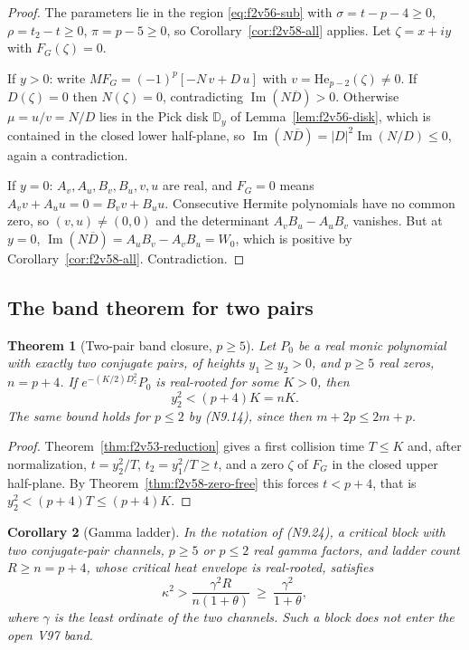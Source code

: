 \documentclass[11pt]{article}
\newtheorem{theorem}{Theorem}[section]
\newtheorem{corollary}[theorem]{Corollary}
\theoremstyle{definition}
\theoremstyle{remark}
\begin{document}
\begin{proof}
The parameters lie in the region \eqref{eq:f2v56-sub} with
\(\sigma=t-p-4\ge0\), \(\rho=t_2-t\ge0\), \(\pi=p-5\ge0\), so
Corollary~\ref{cor:f2v58-all} applies.  Let \(\zeta=x+iy\) with
\(F_G(\zeta)=0\).

If \(y>0\): write \(MF_G=(-1)^p[-N\,v+D\,u]\) with
\(v=\mathrm{He}_{p-2}(\zeta)\ne0\).  If \(D(\zeta)=0\) then
\(N(\zeta)=0\), contradicting \(\operatorname{Im}(N\overline D)>0\).
Otherwise \(\mu=u/v=N/D\) lies in the Pick disk \(\mathbb D_y\) of
Lemma~\ref{lem:f2v56-disk}, which is contained in the closed lower
half-plane, so \(\operatorname{Im}(N\overline D)=|D|^2\operatorname{Im}(N/D)\le0\),
again a contradiction.

If \(y=0\): \(A_v,A_u,B_v,B_u,v,u\) are real, and \(F_G=0\) means
\(A_vv+A_uu=0=B_vv+B_uu\).  Consecutive Hermite polynomials have no
common zero, so \((v,u)\ne(0,0)\) and the determinant
\(A_vB_u-A_uB_v\) vanishes.  But at \(y=0\),
\(\operatorname{Im}(N\overline D)=A_uB_v-A_vB_u=W_0\), which is positive
by Corollary~\ref{cor:f2v58-all}.  Contradiction.
\end{proof}

\subsection{The band theorem for two pairs}

\begin{theorem}[Two-pair band closure, \(p\ge5\)]
\label{thm:f2v58-band}
Let \(P_0\) be a real monic polynomial with exactly two conjugate pairs,
of heights \(y_1\ge y_2>0\), and \(p\ge5\) real zeros, \(n=p+4\).  If
\(e^{-(K/2)D_z^2}P_0\) is real-rooted for some \(K>0\), then
\begin{equation}
 \boxed{\;y_2^2<(p+4)K=nK.\;}
 \label{eq:f2v58-bound}
\end{equation}
The same bound holds for \(p\le2\) by \textup{(N9.14)}, since then
\(m+2p\le2m+p\).
\end{theorem}

\begin{proof}
Theorem~\ref{thm:f2v53-reduction} gives a first collision time
\(T\le K\) and, after normalization, \(t=y_2^2/T\), \(t_2=y_1^2/T\ge t\),
and a zero \(\zeta\) of \(F_G\) in the closed upper half-plane.  By
Theorem~\ref{thm:f2v58-zero-free} this forces \(t<p+4\), that is
\(y_2^2<(p+4)T\le(p+4)K\).
\end{proof}

\begin{corollary}[Gamma ladder]
\label{cor:f2v58-gamma}
In the notation of \textup{(N9.24)}, a critical block with two
conjugate-pair channels, \(p\ge5\) or \(p\le2\) real gamma factors, and
ladder count \(R\ge n=p+4\), whose critical heat envelope is real-rooted,
satisfies
\begin{equation}
 \boxed{\;\kappa^2>\frac{\gamma^2R}{n(1+\theta)}\ \ge\ \frac{\gamma^2}{1+\theta},\;}
 \label{eq:f2v58-gamma}
\end{equation}
where \(\gamma\) is the least ordinate of the two channels.  Such a
block does not enter the open V97 band.
\end{corollary}
\end{document}
